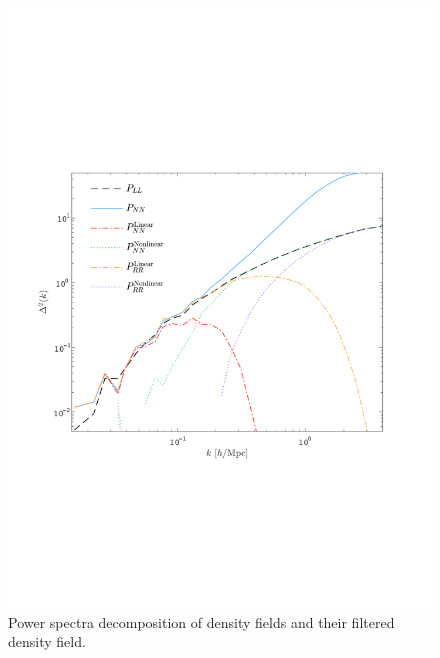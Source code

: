 \documentclass[aps,prd,twocolumn,superscriptaddress,amsfont,amssymb,amsmath,nofootinbib,showpacs,balancelastpage]{revtex4-1}
\begin{document}
\begin{figure}[t] \centering
  \includegraphics[width=1.0\linewidth]{power.pdf}
  \caption{Power spectra decomposition of density fields and their
  filtered density field.}
  \label{fig.recopower}
\end{figure}
\end{document}

